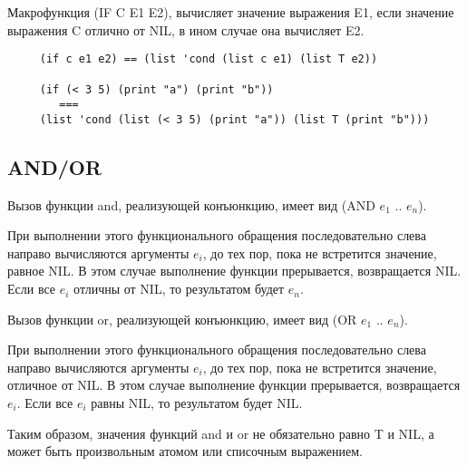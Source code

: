 Макрофункция (IF C E1 E2), вычисляет значение выражения E1, если значение выражения C отлично от NIL, в ином случае она вычисляет E2.

\begin{lstlisting}
     (if c e1 e2) == (list 'cond (list c e1) (list T e2))

     (if (< 3 5) (print "a") (print "b"))
        ===
     (list 'cond (list (< 3 5) (print "a")) (list T (print "b")))
\end{lstlisting}

\subsection{AND/OR}

Вызов функции and, реализующей конъюнкцию, имеет вид (AND $e_1$ .. $e_n$). 

При выполнении этого функционального обращения последовательно слева направо вычисляются аргументы $e_i$, до тех пор, пока не встретится значение, равное NIL. В этом случае выполнение функции прерывается, возвращается NIL. Если все $e_i$ отличны от NIL, то результатом будет $e_n$.

\text{\newline}

Вызов функции or, реализующей конъюнкцию, имеет вид (OR $e_1$ .. $e_n$). 

При выполнении этого функционального обращения последовательно слева направо вычисляются аргументы $e_i$, до тех пор, пока не встретится значение, отличное от NIL. В этом случае выполнение функции прерывается, возвращается $e_i$. Если все $e_i$ равны NIL, то результатом будет NIL.

\text{\newline}

Таким образом, значения функций and и or не обязательно равно T и NIL, а может быть произвольным атомом или списочным выражением. 
